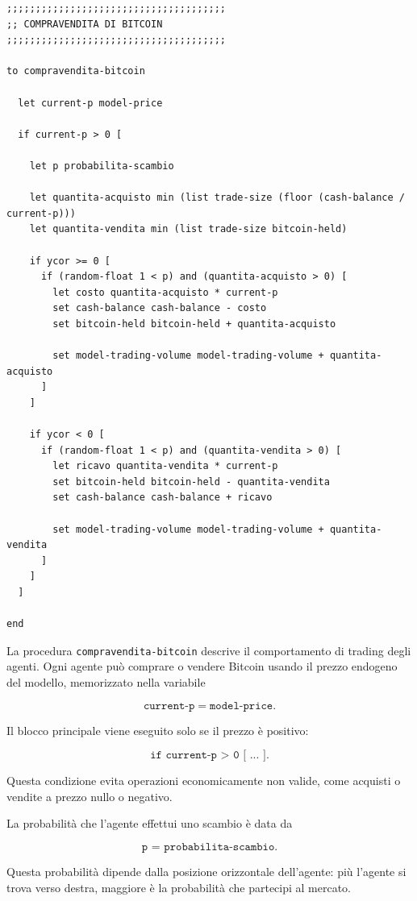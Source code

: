 \begin{lstlisting}[caption={Procedura di compravendita di Bitcoin degli agenti}]
;;;;;;;;;;;;;;;;;;;;;;;;;;;;;;;;;;;;;;
;; COMPRAVENDITA DI BITCOIN
;;;;;;;;;;;;;;;;;;;;;;;;;;;;;;;;;;;;;;

to compravendita-bitcoin

  let current-p model-price

  if current-p > 0 [

    let p probabilita-scambio

    let quantita-acquisto min (list trade-size (floor (cash-balance / current-p)))
    let quantita-vendita min (list trade-size bitcoin-held)

    if ycor >= 0 [
      if (random-float 1 < p) and (quantita-acquisto > 0) [
        let costo quantita-acquisto * current-p
        set cash-balance cash-balance - costo
        set bitcoin-held bitcoin-held + quantita-acquisto

        set model-trading-volume model-trading-volume + quantita-acquisto
      ]
    ]

    if ycor < 0 [
      if (random-float 1 < p) and (quantita-vendita > 0) [
        let ricavo quantita-vendita * current-p
        set bitcoin-held bitcoin-held - quantita-vendita
        set cash-balance cash-balance + ricavo

        set model-trading-volume model-trading-volume + quantita-vendita
      ]
    ]
  ]

end
\end{lstlisting}

La procedura \texttt{compravendita-bitcoin} descrive il comportamento di trading
degli agenti. Ogni agente può comprare o vendere Bitcoin usando il prezzo
endogeno del modello, memorizzato nella variabile

\[
\texttt{current-p} = \texttt{model-price}.
\]

Il blocco principale viene eseguito solo se il prezzo è positivo:

\[
\texttt{if current-p > 0 [ ... ]}.
\]

Questa condizione evita operazioni economicamente non valide, come acquisti o
vendite a prezzo nullo o negativo.

La probabilità che l'agente effettui uno scambio è data da

\[
\texttt{p = probabilita-scambio}.
\]

Questa probabilità dipende dalla posizione orizzontale dell'agente: più l'agente
si trova verso destra, maggiore è la probabilità che partecipi al mercato.


